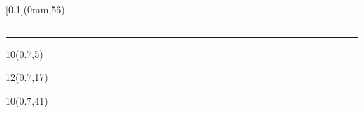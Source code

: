 \begin{frame}[plain]
	\begin{textblock*}{\paperwidth}[0,1](0mm,56\TPVertModule)
		\textcolor{rouge}{\rule{\banderougewidth}{\banderougeheight}}%
		\textcolor{bleu}{\rule{\bandeorwidth}{\bandeorheight}}
	\end{textblock*}
	
	\begin{textblock*}{10\TPHorizModule}(0.7\TPHorizModule,5\TPVertModule)
		\textcolor[rgb]{0.13,0.13,0.13}{\webinaire}
	\end{textblock*}
	
	\begin{textblock*}{12\TPHorizModule}(0.7\TPHorizModule,17\TPVertModule)
		\textcolor[rgb]{0.13,0.13,0.13}{\titlefmt}
	\end{textblock*}
	
	\begin{textblock*}{10\TPHorizModule}(0.7\TPHorizModule,41\TPVertModule)
		\textcolor[rgb]{0.13,0.13,0.13}{\datefmt}
	\end{textblock*}
	\note{}	
\end{frame}
\endgroup
